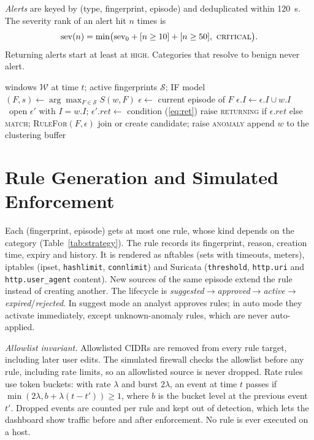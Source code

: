 \documentclass[conference]{IEEEtran}
\begin{document}
\textit{Alerts} are keyed by (type, fingerprint, episode) and deduplicated within 120~s. The severity rank of an alert hit $n$ times is
\begin{equation}
\mathrm{sev}(n)=\min\!\big(\mathrm{sev}_0+[n\ge10]+[n\ge50],\ \textsc{critical}\big).
\end{equation}
Returning alerts start at least at \textsc{high}. Categories that resolve to benign never alert.

\begin{algorithm}[t]
\caption{Live matching, episodes and returning detection}\label{alg:match}
\small
\begin{algorithmic}[1]
\Require windows $\mathcal W$ at time $t$; active fingerprints $\mathcal S$; IF model
  \State $(F,s)\gets\arg\max_{F\in\mathcal S}S(w,F)$
    \State $\epsilon\gets$ current episode of $F$
     $\epsilon.I\gets\epsilon.I\cup w.I$
    \Else\ open $\epsilon'$ with $I=w.I$; $\epsilon'.\mathit{ret}\gets$ condition (\ref{eq:ret})
    \EndIf
    \State raise \textsc{returning} if $\epsilon.\mathit{ret}$ else \textsc{match}; \textsc{RuleFor}$(F,\epsilon)$
    \State join or create candidate; raise \textsc{anomaly}
  \EndIf
  \State append $w$ to the clustering buffer
\EndFor
\end{algorithmic}
\end{algorithm}

\section{Rule Generation and Simulated Enforcement}\label{sec:rules}
Each (fingerprint, episode) gets at most one rule, whose kind depends on the category (Table~\ref{tab:strategy}). The rule records its fingerprint, reason, creation time, expiry and history. It is rendered as nftables (sets with timeouts, meters), iptables (ipset, \texttt{hashlimit}, \texttt{connlimit}) and Suricata (\texttt{threshold}, \texttt{http.uri} and \texttt{http.user\_agent} content). New sources of the same episode extend the rule instead of creating another. The lifecycle is \emph{suggested}$\to$\emph{approved}$\to$\emph{active}$\to$\emph{expired}/\emph{rejected}. In suggest mode an analyst approves rules; in auto mode they activate immediately, except unknown-anomaly rules, which are never auto-applied.

\textit{Allowlist invariant.} Allowlisted CIDRs are removed from every rule target, including later user edits. The simulated firewall checks the allowlist before any rule, including rate limits, so an allowlisted source is never dropped. Rate rules use token buckets: with rate $\lambda$ and burst $2\lambda$, an event at time $t$ passes if $\min(2\lambda, b+\lambda(t-t'))\ge1$, where $b$ is the bucket level at the previous event $t'$. Dropped events are counted per rule and kept out of detection, which lets the dashboard show traffic before and after enforcement. No rule is ever executed on a host.
\end{document}
